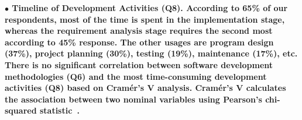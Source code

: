 \nd\bf{$\bullet$ Timeline of Development Activities (Q8).} According to 65\% of our respondents, most of
the time is spent in the implementation stage, whereas the requirement analysis
stage requires the second most according to 45\% response. The other usages are
program design (37\%), project planning (30\%), testing (19\%), maintenance
(17\%), etc. There is no significant correlation between software development
methodologies (Q6) and the most time-consuming development activities (Q8) based on Cram\'{e}r's V \citep{Cramer1946} analysis. Cram\'{e}r's V 
calculates the association between two nominal
variables using Pearson's chi-squared statistic~\citep{Sheskin2007}.


% 




